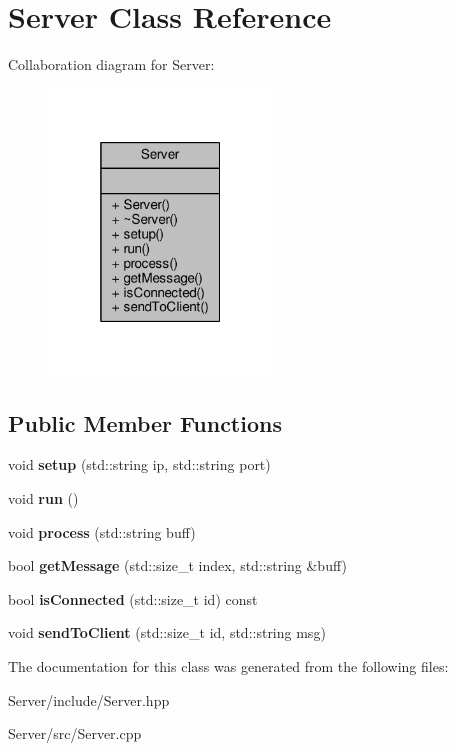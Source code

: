 \hypertarget{class_server}{}\section{Server Class Reference}
\label{class_server}


Collaboration diagram for Server\+:\nopagebreak
\begin{figure}[H]
\begin{center}
\leavevmode
\includegraphics[width=169pt]{d6/ded/class_server__coll__graph}
\end{center}
\end{figure}
\subsection*{Public Member Functions}
\begin{DoxyCompactItemize}
\item 
void {\bfseries setup} (std\+::string ip, std\+::string port)\hypertarget{class_server_a1f0c404d6a5e8b777caf3111bd24b9d0}{}\label{class_server_a1f0c404d6a5e8b777caf3111bd24b9d0}

\item 
void {\bfseries run} ()\hypertarget{class_server_abb27d30b40a94326e3fd629d3b30b7d5}{}\label{class_server_abb27d30b40a94326e3fd629d3b30b7d5}

\item 
void {\bfseries process} (std\+::string buff)\hypertarget{class_server_a955fde2e51cbc254365ff1aa5972b86f}{}\label{class_server_a955fde2e51cbc254365ff1aa5972b86f}

\item 
bool {\bfseries get\+Message} (std\+::size\+\_\+t index, std\+::string \&buff)\hypertarget{class_server_aada47e3b6b3fda020a1fc05102591569}{}\label{class_server_aada47e3b6b3fda020a1fc05102591569}

\item 
bool {\bfseries is\+Connected} (std\+::size\+\_\+t id) const \hypertarget{class_server_a14d1c0e11af81265f85e71ca5f283e98}{}\label{class_server_a14d1c0e11af81265f85e71ca5f283e98}

\item 
void {\bfseries send\+To\+Client} (std\+::size\+\_\+t id, std\+::string msg)\hypertarget{class_server_a2546363cb425281e5841f47e25e31ad4}{}\label{class_server_a2546363cb425281e5841f47e25e31ad4}

\end{DoxyCompactItemize}


The documentation for this class was generated from the following files\+:\begin{DoxyCompactItemize}
\item 
Server/include/Server.\+hpp\item 
Server/src/Server.\+cpp\end{DoxyCompactItemize}
